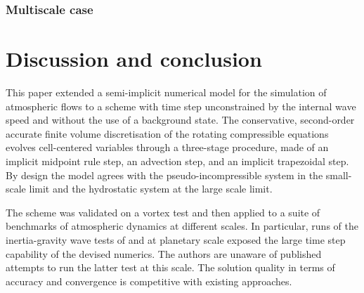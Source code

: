 \documentclass{ametsoc}
\theoremstyle{definition}
\begin{document}
\subsubsection{Multiscale case}

\cite{BaldaufBrdar2013}


\section{Discussion and conclusion}
\label{sec:Conclusions}	

This paper extended a semi-implicit numerical model for the simulation of atmospheric flows to a scheme with time step unconstrained by the internal wave speed and without the use of a background state. The conservative, second-order accurate finite volume discretisation of the rotating compressible equations evolves cell-centered variables through a three-stage procedure, made of an implicit midpoint rule step, an advection step, and an implicit trapezoidal step. By design the model agrees with the pseudo-incompressible system in the small-scale limit and the hydrostatic system at the large scale limit.

The scheme was validated on a vortex test and then applied to a suite of benchmarks of atmospheric dynamics at different scales. In particular, runs of the inertia-gravity wave tests of \cite{BaldaufBrdar2013} and \cite{SkamarockKlemp1994} at planetary scale exposed the large time step capability of the devised numerics. The authors are unaware of published attempts to run the latter test at this scale. The solution quality in terms of accuracy and convergence is competitive with existing approaches.
\end{document}
